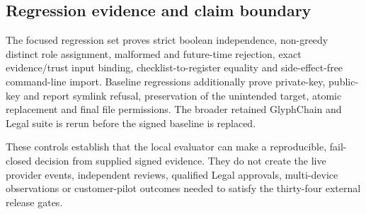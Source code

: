 \subsection{Regression evidence and claim boundary}

The focused regression set proves strict boolean independence, non-greedy distinct
role assignment, malformed and future-time rejection, exact evidence/trust input
binding, checklist-to-register equality and side-effect-free command-line import.
Baseline regressions additionally prove private-key, public-key and report symlink
refusal, preservation of the unintended target, atomic replacement and final file
permissions.
The broader retained GlyphChain and Legal suite is rerun before the signed baseline
is replaced.

These controls establish that the local evaluator can make a reproducible,
fail-closed decision from supplied signed evidence.  They do not create the live
provider events, independent reviews, qualified Legal approvals, multi-device
observations or customer-pilot outcomes needed to satisfy the thirty-four external
release gates.
